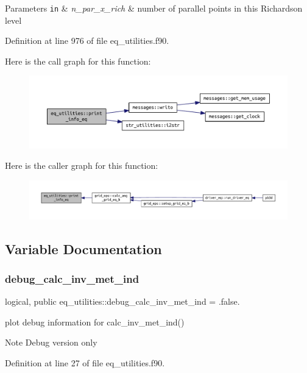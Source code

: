 \begin{DoxyParams}[1]{Parameters}
\mbox{\tt in}  & {\em n\+\_\+par\+\_\+x\+\_\+rich} & number of parallel points in this Richardson level \\
\hline
\end{DoxyParams}


Definition at line 976 of file eq\+\_\+utilities.\+f90.

Here is the call graph for this function\+:\nopagebreak
\begin{figure}[H]
\begin{center}
\leavevmode
\includegraphics[width=350pt]{namespaceeq__utilities_a40f397d20b45432117744ca16870ddbb_cgraph}
\end{center}
\end{figure}
Here is the caller graph for this function\+:\nopagebreak
\begin{figure}[H]
\begin{center}
\leavevmode
\includegraphics[width=350pt]{namespaceeq__utilities_a40f397d20b45432117744ca16870ddbb_icgraph}
\end{center}
\end{figure}


\subsection{Variable Documentation}
\mbox{\label{namespaceeq__utilities_aedf0e1858d0bd16218a290f4857d416a}} 
\subsubsection{\texorpdfstring{debug\+\_\+calc\+\_\+inv\+\_\+met\+\_\+ind}{debug\_calc\_inv\_met\_ind}}
{\footnotesize\ttfamily logical, public eq\+\_\+utilities\+::debug\+\_\+calc\+\_\+inv\+\_\+met\+\_\+ind = .false.}



plot debug information for calc\+\_\+inv\+\_\+met\+\_\+ind() 

\begin{DoxyNote}{Note}
Debug version only 
\end{DoxyNote}


Definition at line 27 of file eq\+\_\+utilities.\+f90.

